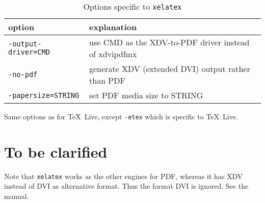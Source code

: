 \documentclass{article}
\newcommand{\xelatex}{\texttt{xelatex}}
\newcommand{\texlive}{\TeX~Live}
\begin{document}
\begin{longtable}{|ll|}
  \toprule
  option & explanation \\
  \midrule
  \midrule
  \endfirsthead%
  \bottomrule
  \caption{\label{tab:latexOptionsXelatexMiktex} Options specific to \xelatex{} }
  \endlastfoot%
  \texttt{-output-driver=CMD}      & use CMD as the XDV-to-PDF driver instead of xdvipdfmx \\
  \texttt{-no-pdf}                 & generate XDV (extended DVI) output rather than PDF \\
  \texttt{-papersize=STRING}       & set PDF media size to STRING \\
  \end{longtable}

  Same options as for \texlive, except \texttt{-etex} which is specific to \texlive. 


\section{To be clarified}\label{sec:TBC}

Note that \xelatex{} works as the other engines for PDF, 
whereas it has XDV instead of DVI as alternative format. 
Thus the format DVI is ignored. 
See the manual. 






{}%
\end{document}
